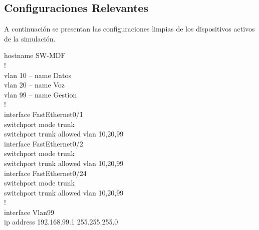 \documentclass[11pt, letterpaper]{article}
\begin{document}
\subsection*{Configuraciones Relevantes}

A continuación se presentan las configuraciones limpias de los dispositivos activos de la simulación.

\begin{tcolorbox}[enhanced, breakable, colback=black!95, colframe=AzulUNAM,
                  title=\textbf{SW-MDF -- Switch Core (MDF)}, arc=2mm, boxrule=1pt,
                  attach boxed title to top left={xshift=5mm, yshift=-3mm},
                  boxed title style={colback=AzulUNAM},
                  fontupper=\ttfamily\small\color{white}]
hostname SW-MDF\\
!\\
vlan 10 -- name Datos\\
vlan 20 -- name Voz\\
vlan 99 -- name Gestion\\
!\\
interface FastEthernet0/1\\
\hspace{1em}switchport mode trunk\\
\hspace{1em}switchport trunk allowed vlan 10,20,99\\
interface FastEthernet0/2\\
\hspace{1em}switchport mode trunk\\
\hspace{1em}switchport trunk allowed vlan 10,20,99\\
interface FastEthernet0/24\\
\hspace{1em}switchport mode trunk\\
\hspace{1em}switchport trunk allowed vlan 10,20,99\\
!\\
interface Vlan99\\
\hspace{1em}ip address 192.168.99.1 255.255.255.0
\end{tcolorbox}
\end{document}
